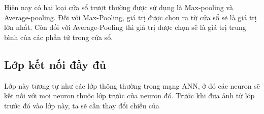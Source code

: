 Hiện nay có hai loại cửa sổ trượt thường được sử dụng là Max-pooling và Average-pooling. Đối với Max-Pooling, giá trị được chọn ra từ cửa sổ sẽ là giá trị lớn nhất. Còn đối với Average-Pooling thì giá trị được chọn sẽ là giá trị trung bình của các phần tử trong cửa sổ. 

\subsection{Lớp kết nối đầy đủ}
Lớp này tương tự như các lớp thông thường trong mạng ANN, ở đó các neuron sẽ kết nối với mọi neuron thuộc lớp trước của neuron đó. Trước khi đưa ảnh từ lớp trước đó vào lớp này, ta sẽ cần thay đổi chiều của 